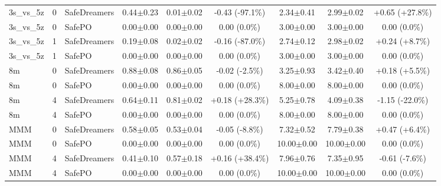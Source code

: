 \documentclass{article}
\begin{document}
\begin{longtable}{lclcccccc}
\midrule
3s\_vs\_5z & 0 & SafeDreamers & 0.44$\pm$0.23 & 0.01$\pm$0.02 & \textcolor{red!100!black}{-0.43 (-97.1\%)} & 2.34$\pm$0.41 & 2.99$\pm$0.02 & \textcolor{red!70!black}{+0.65 (+27.8\%)} \\
3s\_vs\_5z & 0 & SafePO & 0.00$\pm$0.00 & 0.00$\pm$0.00 & \textcolor{red!40!black}{0.00 (0.0\%)} & 3.00$\pm$0.00 & 3.00$\pm$0.00 & \textcolor{green!40!black}{0.00 (0.0\%)} \\
3s\_vs\_5z & 1 & SafeDreamers & 0.19$\pm$0.08 & 0.02$\pm$0.02 & \textcolor{red!100!black}{-0.16 (-87.0\%)} & 2.74$\pm$0.12 & 2.98$\pm$0.02 & \textcolor{red!55!black}{+0.24 (+8.7\%)} \\
3s\_vs\_5z & 1 & SafePO & 0.00$\pm$0.00 & 0.00$\pm$0.00 & \textcolor{red!40!black}{0.00 (0.0\%)} & 3.00$\pm$0.00 & 3.00$\pm$0.00 & \textcolor{green!40!black}{0.00 (0.0\%)} \\
\midrule
8m & 0 & SafeDreamers & 0.88$\pm$0.08 & 0.86$\pm$0.05 & \textcolor{red!40!black}{-0.02 (-2.5\%)} & 3.25$\pm$0.93 & 3.42$\pm$0.40 & \textcolor{red!55!black}{+0.18 (+5.5\%)} \\
8m & 0 & SafePO & 0.00$\pm$0.00 & 0.00$\pm$0.00 & \textcolor{red!40!black}{0.00 (0.0\%)} & 8.00$\pm$0.00 & 8.00$\pm$0.00 & \textcolor{green!40!black}{0.00 (0.0\%)} \\
8m & 4 & SafeDreamers & 0.64$\pm$0.11 & 0.81$\pm$0.02 & \textcolor{green!70!black}{+0.18 (+28.3\%)} & 5.25$\pm$0.78 & 4.09$\pm$0.38 & \textcolor{green!70!black}{-1.15 (-22.0\%)} \\
8m & 4 & SafePO & 0.00$\pm$0.00 & 0.00$\pm$0.00 & \textcolor{red!40!black}{0.00 (0.0\%)} & 8.00$\pm$0.00 & 8.00$\pm$0.00 & \textcolor{green!40!black}{0.00 (0.0\%)} \\
\midrule
MMM & 0 & SafeDreamers & 0.58$\pm$0.05 & 0.53$\pm$0.04 & \textcolor{red!55!black}{-0.05 (-8.8\%)} & 7.32$\pm$0.52 & 7.79$\pm$0.38 & \textcolor{red!55!black}{+0.47 (+6.4\%)} \\
MMM & 0 & SafePO & 0.00$\pm$0.00 & 0.00$\pm$0.00 & \textcolor{red!40!black}{0.00 (0.0\%)} & 10.00$\pm$0.00 & 10.00$\pm$0.00 & \textcolor{green!40!black}{0.00 (0.0\%)} \\
MMM & 4 & SafeDreamers & 0.41$\pm$0.10 & 0.57$\pm$0.18 & \textcolor{green!85!black}{+0.16 (+38.4\%)} & 7.96$\pm$0.76 & 7.35$\pm$0.95 & \textcolor{green!55!black}{-0.61 (-7.6\%)} \\
MMM & 4 & SafePO & 0.00$\pm$0.00 & 0.00$\pm$0.00 & \textcolor{red!40!black}{0.00 (0.0\%)} & 10.00$\pm$0.00 & 10.00$\pm$0.00 & \textcolor{green!40!black}{0.00 (0.0\%)} \\

\end{longtable}
\end{document}

